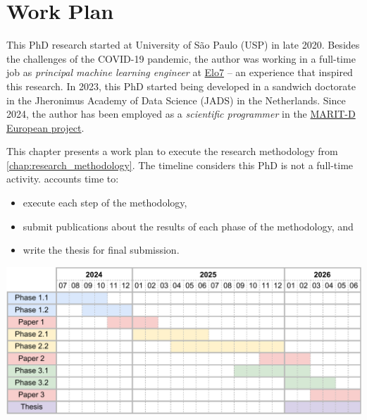 
\chapter{Work Plan}
\label{chap:work_plan}

This PhD research started at University of São Paulo (USP) in late 2020.
Besides the challenges of the COVID-19 pandemic, the author was working in
a full-time job as \emph{principal machine learning engineer} at
\href{https://www.elo7.com.br}{Elo7} -- an experience that inspired
this research. In 2023, this PhD started being developed in a sandwich
doctorate in the Jheronimus Academy of Data Science (JADS) in the Netherlands.
Since 2024, the author has been employed as a \emph{scientific programmer}
in the \href{https://marit-d.eu/}{MARIT-D European project}.

This chapter presents a work plan to execute the research methodology
from \cref{chap:research_methodology}. The timeline considers this PhD
is not a full-time activity.  accounts time to:
\begin{itemize}
  \item execute each step of the methodology,
  \item submit publications about the results of each phase of the methodology, and
  \item write the thesis for final submission.
\end{itemize}

\begin{table}[b!]
  \centering
  \includegraphics[width=0.85\linewidth]{tables/Timetable.pdf}
  \caption[%
    Work plan%
  ]{%
    \emph{Work Plan}. The timetable summarizes the expected number
    of months to complete the research methodology introduced in
    \cref{chap:research_methodology}. Each line represents a task,
    each column represents a month. Lines and cells are color-coded
    according to \cref{fig:research_methodology}.
  }
  \label{tab:work_plan}
\end{table}
